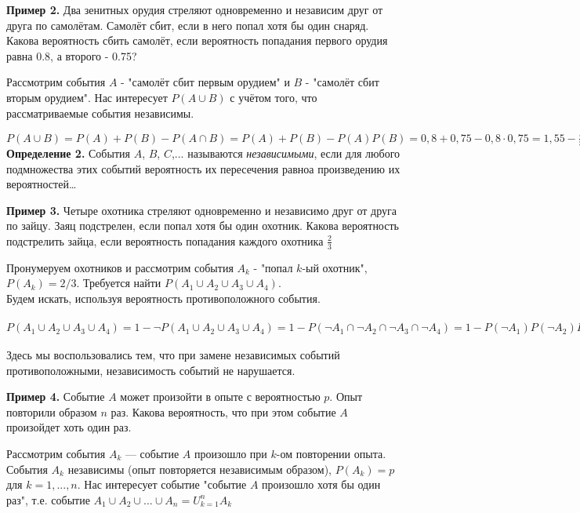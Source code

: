\documentclass{article}
\begin{document}
\textbf{Пример 2.} Два зенитных орудия стреляют одновременно и независим друг от друга по самолётам. Самолёт сбит, если в него попал хотя бы один снаряд. Какова вероятность сбить самолёт, если вероятность попадания первого орудия равна 0.8, а второго - 0.75?

Рассмотрим события
$A$ - "самолёт сбит первым орудием" и $B$ - "самолёт сбит вторым орудием".
Нас интересует \(P(A \cup B)\) с учётом того, что рассматриваемые события независимы.

\(P(A \cup B) = P(A) + P(B) - P(A \cap B) = P(A) + P(B) - P(A)P(B) = 0,8 + 0,75 - 0,8 \cdot 0,75 = 1,55 - \frac{4}{5} \cdot \frac{3}{4} = 1,55 - 0,6 = 0,95\)
\textbf{Определение 2.} События $A$, $B$, $C$,... называются \textit{независимыми}, если для любого подмножества этих событий вероятность их пересечения равноа произведению их вероятностей\dots

\textbf{Пример 3.} Четыре охотника стреляют одновременно и независимо друг от друга по зайцу. 
Заяц подстрелен, если попал хотя бы один охотник. Какова вероятность подстрелить зайца, если вероятность попадания каждого охотника \(\frac{2}{3}\)

Пронумеруем охотников и рассмотрим события $A_k$ - "попал $k$-ый охотник",\\
\(P(A_k) = 2/3\). Требуется найти \(P(A_1 \cup A_2 \cup A_3 \cup A_4)\).\\
Будем искать, используя вероятность противоположного события. 

\( P(A_1 \cup A_2 \cup A_3 \cup A_4) = 1 - \lnot P(A_1 \cup A_2 \cup A_3 \cup A_4) = 1 - P(\lnot A_1 \cap \lnot A_2 \cap \lnot A_3 \cap \lnot A_4) = 1 - P(\lnot A_1)P(\lnot A_2)P(\lnot A_3)P(\lnot A_4) = 1 - (\frac{1}{3})^4 = \frac{80}{81} = 0,988 \)

Здесь мы воспользовались тем, что при замене независимых событий противоположными, независимость событий не нарушается.


\textbf{Пример 4.} Событие $A$ может произойти в опыте с вероятностью $p$. Опыт повторили  образом $n$ раз. Какова вероятность, что при этом событие $A$ произойдет хоть один раз.

Рассмотрим события \(A_k\) — событие $A$ произошло при $k$-ом повторении опыта. События \(A_k\) независимы (опыт повторяется независимым образом),
\(P(A_k) = p\) для \(k = 1,..., n.\)
Нас интересует событие "событие $A$ произошло хотя бы один раз", т.е. событие \(A_1 \cup A_2 \cup ... \cup A_n = U^n_{k = 1}A_k\)
\end{document}
